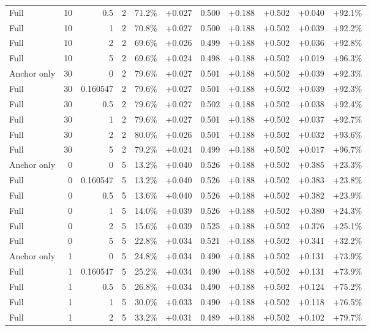 \begin{table}[htbp]
\begin{tabular}{lrrrccccccc}
Full & 10 & 0.5 & 2 & 71.2\% & +0.027 & 0.500 & +0.188 & +0.502 & +0.040 & +92.1\% \\
Full & 10 & 1 & 2 & 70.8\% & +0.027 & 0.500 & +0.188 & +0.502 & +0.039 & +92.2\% \\
Full & 10 & 2 & 2 & 69.6\% & +0.026 & 0.499 & +0.188 & +0.502 & +0.036 & +92.8\% \\
Full & 10 & 5 & 2 & 69.6\% & +0.024 & 0.498 & +0.188 & +0.502 & +0.019 & +96.3\% \\
Anchor only & 30 & 0 & 2 & 79.6\% & +0.027 & 0.501 & +0.188 & +0.502 & +0.039 & +92.3\% \\
Full & 30 & 0.160547 & 2 & 79.6\% & +0.027 & 0.501 & +0.188 & +0.502 & +0.039 & +92.3\% \\
Full & 30 & 0.5 & 2 & 79.6\% & +0.027 & 0.502 & +0.188 & +0.502 & +0.038 & +92.4\% \\
Full & 30 & 1 & 2 & 79.6\% & +0.027 & 0.501 & +0.188 & +0.502 & +0.037 & +92.7\% \\
Full & 30 & 2 & 2 & 80.0\% & +0.026 & 0.501 & +0.188 & +0.502 & +0.032 & +93.6\% \\
Full & 30 & 5 & 2 & 79.2\% & +0.024 & 0.499 & +0.188 & +0.502 & +0.017 & +96.7\% \\
Anchor only & 0 & 0 & 5 & 13.2\% & +0.040 & 0.526 & +0.188 & +0.502 & +0.385 & +23.3\% \\
Full & 0 & 0.160547 & 5 & 13.2\% & +0.040 & 0.526 & +0.188 & +0.502 & +0.383 & +23.8\% \\
Full & 0 & 0.5 & 5 & 13.6\% & +0.040 & 0.526 & +0.188 & +0.502 & +0.382 & +23.9\% \\
Full & 0 & 1 & 5 & 14.0\% & +0.039 & 0.526 & +0.188 & +0.502 & +0.380 & +24.3\% \\
Full & 0 & 2 & 5 & 15.6\% & +0.039 & 0.525 & +0.188 & +0.502 & +0.376 & +25.1\% \\
Full & 0 & 5 & 5 & 22.8\% & +0.034 & 0.521 & +0.188 & +0.502 & +0.341 & +32.2\% \\
Anchor only & 1 & 0 & 5 & 24.8\% & +0.034 & 0.490 & +0.188 & +0.502 & +0.131 & +73.9\% \\
Full & 1 & 0.160547 & 5 & 25.2\% & +0.034 & 0.490 & +0.188 & +0.502 & +0.131 & +73.9\% \\
Full & 1 & 0.5 & 5 & 26.8\% & +0.034 & 0.490 & +0.188 & +0.502 & +0.124 & +75.2\% \\
Full & 1 & 1 & 5 & 30.0\% & +0.033 & 0.490 & +0.188 & +0.502 & +0.118 & +76.5\% \\
Full & 1 & 2 & 5 & 33.2\% & +0.031 & 0.489 & +0.188 & +0.502 & +0.102 & +79.7\% \\

\end{tabular}
\end{table}
